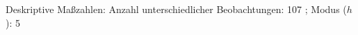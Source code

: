 				\label{tableValues:asys04}
				\vspace*{-\baselineskip}
                    \begin{noten}
                	    \note{} Deskriptive Maßzahlen:
                	    Anzahl unterschiedlicher Beobachtungen: 107%
                	    ; 
                	      Modus ($h$): 5
                     \end{noten}

